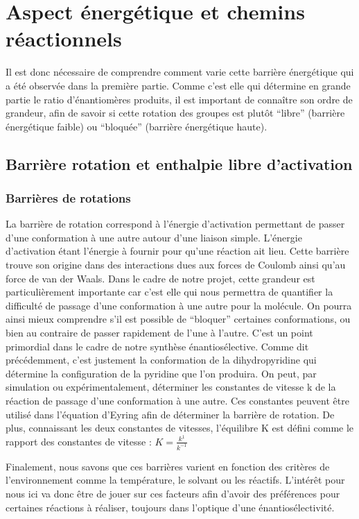 \documentclass{article}
\begin{document}
\section{Aspect énergétique et chemins réactionnels}

Il est donc nécessaire de comprendre comment varie cette barrière énergétique qui a été observée dans la première partie. Comme c’est elle qui détermine en grande partie le ratio d’énantiomères produits, il est important de connaître son ordre de grandeur, afin de savoir si cette rotation des groupes est plutôt “libre” (barrière énergétique faible) ou “bloquée” (barrière énergétique haute).

\subsection{Barrière rotation et enthalpie libre d’activation}

\subsubsection{Barrières de rotations}

La barrière de rotation correspond à l'énergie d'activation permettant de passer d'une conformation à une autre autour d'une liaison simple. L’énergie d’activation étant l’énergie à fournir pour qu’une réaction ait lieu.
\medbreak
Cette barrière trouve son origine dans des interactions dues aux forces de Coulomb ainsi qu’au force de van der Waals. Dans le cadre de notre projet, cette grandeur est particulièrement importante car c’est elle qui nous permettra de quantifier la difficulté de passage d’une conformation à une autre pour la molécule. On pourra ainsi mieux comprendre s’il est possible de “bloquer” certaines conformations, ou bien au contraire de passer rapidement de l'une à l'autre. C’est un point primordial dans le cadre de notre synthèse énantiosélective. Comme dit précédemment, c’est justement la conformation de la dihydropyridine qui détermine la configuration de la pyridine que l’on produira. 
\medbreak
On peut, par simulation ou expérimentalement, déterminer les constantes de vitesse k de la réaction de passage d’une conformation à une autre. Ces constantes peuvent être utilisé dans l’équation d’Eyring afin de déterminer la barrière de rotation.
De plus, connaissant les deux constantes de vitesses, l'équilibre K est défini comme le rapport des constantes de vitesse : $K=\frac{k^1}{k^{-1}}$

Finalement, nous savons que ces barrières varient en fonction des critères de l'environnement comme la température, le solvant ou les réactifs. L’intérêt pour nous ici va donc être de jouer sur ces facteurs afin d’avoir des préférences pour certaines réactions à réaliser, toujours dans l’optique d’une énantiosélectivité.
\medbreak
\end{document}
